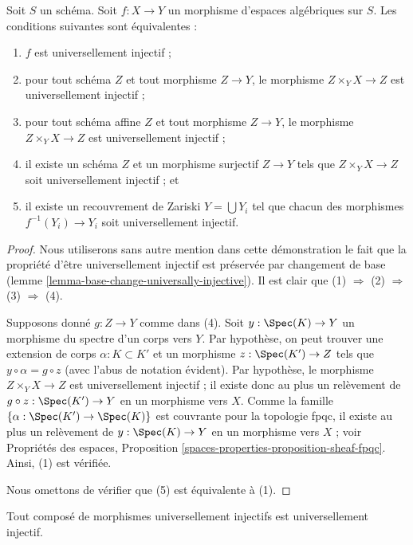 \begin{lemma}
\label{lemma-universally-injective-local}
Soit $S$ un schéma.
Soit $f : X \to Y$ un morphisme d'espaces algébriques sur $S$.
Les conditions suivantes sont équivalentes :
\begin{enumerate}
\item $f$ est universellement injectif ;
\item pour tout schéma $Z$ et tout morphisme $Z \to Y$, le morphisme
$Z \times_Y X \to Z$ est universellement injectif ;
\item pour tout schéma affine $Z$ et tout morphisme
$Z \to Y$, le morphisme $Z \times_Y X \to Z$ est universellement injectif ;
\item il existe un schéma $Z$ et un morphisme surjectif
$Z \to Y$ tels que $Z \times_Y X \to Z$ soit universellement injectif ; et
\item il existe un recouvrement de Zariski $Y = \bigcup Y_i$ tel que
chacun des morphismes $f^{-1}(Y_i) \to Y_i$ soit universellement injectif.
\end{enumerate}
\end{lemma}

\begin{proof}
Nous utiliserons sans autre mention dans cette démonstration le fait que la propriété
d'être universellement injectif est préservée par changement de base
(lemme \ref{lemma-base-change-universally-injective}).
Il est clair que (1) $\Rightarrow$ (2) $\Rightarrow$ (3)
$\Rightarrow$ (4).

\medskip\noindent
Supposons donné $g : Z \to Y$ comme dans (4). Soit $y : \Spec(K) \to Y$ un
morphisme du spectre d'un corps vers $Y$. Par hypothèse, on
peut trouver une extension de corps $\alpha : K \subset K'$ et un morphisme
$z : \Spec(K') \to Z$ tels que $y \circ \alpha = g \circ z$
(avec l'abus de notation évident). Par hypothèse, le
morphisme $Z \times_Y X \to Z$ est universellement injectif ; il existe donc
au plus un
relèvement de $g \circ z : \Spec(K') \to Y$ en un morphisme vers $X$.
Comme la famille $\{\alpha : \Spec(K') \to \Spec(K)\}$ est
couvrante pour la topologie fpqc, il existe au plus un relèvement de
$y : \Spec(K) \to Y$ en un morphisme vers $X$ ; voir
Propriétés des espaces, Proposition
\ref{spaces-properties-proposition-sheaf-fpqc}.
Ainsi, (1) est vérifiée.

\medskip\noindent
Nous omettons de vérifier que (5) est équivalente à (1).
\end{proof}

\begin{lemma}
\label{lemma-composition-universally-injective}
Tout composé de morphismes universellement injectifs est universellement injectif.
\end{lemma}


